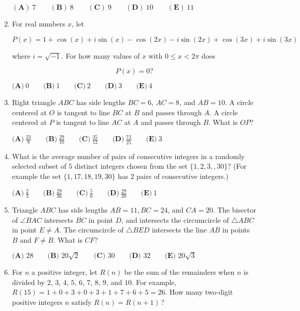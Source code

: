 \documentclass{article}
\begin{document}
\begin{enumerate}[label=\arabic*., itemsep=0.5em]
$(\textbf{A})\: 7\qquad(\textbf{B}) \: 8\qquad(\textbf{C}) \: 9\qquad(\textbf{D}) \: 10\qquad(\textbf{E}) \: 11$\par \vspace{0.5em}\item For real numbers $x$, let 

\begin{equation*}
P(x)=1+\cos(x)+i\sin(x)-\cos(2x)-i\sin(2x)+\cos(3x)+i\sin(3x)
\end{equation*}

where $i = \sqrt{-1}$. For how many values of $x$ with $0\leq x<2\pi$ does 

\begin{equation*}
P(x)=0?
\end{equation*}


$\textbf{(A)}\ 0 \qquad\textbf{(B)}\  1 \qquad\textbf{(C)}\  2 \qquad\textbf{(D)}\
3 \qquad\textbf{(E)}\ 4$\par \vspace{0.5em}\item Right triangle $ABC$ has side lengths $BC=6$, $AC=8$, and $AB=10$. A circle centered at $O$ is tangent to line $BC$ at $B$ and passes through $A$. A circle centered at $P$ is tangent to line $AC$ at $A$ and passes through $B$. What is $OP$?

$\textbf{(A)}\ \frac{23}{8} \qquad\textbf{(B)}\  \frac{29}{10} \qquad\textbf{(C)}\  \frac{35}{12} \qquad\textbf{(D)}\
\frac{73}{25} \qquad\textbf{(E)}\ 3$\par \vspace{0.5em}\item What is the average number of pairs of consecutive integers in a randomly selected subset of $5$ distinct integers chosen from the set $\{ 1, 2, 3, , 30\}$? (For example the set $\{1, 17, 18, 19, 30\}$ has $2$ pairs of consecutive integers.)

$\textbf{(A)}\ \frac{2}{3} \qquad\textbf{(B)}\ \frac{29}{36} \qquad\textbf{(C)}\ \frac{5}{6} \qquad\textbf{(D)}\
\frac{29}{30} \qquad\textbf{(E)}\ 1$\par \vspace{0.5em}\item Triangle $ABC$ has side lengths $AB = 11, BC=24$, and $CA = 20$. The bisector of $\angle{BAC}$ intersects $\overline{BC}$ in point $D$, and intersects the circumcircle of $\triangle{ABC}$ in point $E \ne A$. The circumcircle of $\triangle{BED}$ intersects the line $AB$ in points $B$ and $F \ne B$. What is $CF$?

$\textbf{(A) } 28 \qquad \textbf{(B) } 20\sqrt{2} \qquad \textbf{(C) } 30 \qquad \textbf{(D) } 32 \qquad \textbf{(E) } 20\sqrt{3}$\par \vspace{0.5em}\item For $n$ a positive integer, let $R(n)$ be the sum of the remainders when $n$ is divided by $2$, $3$, $4$, $5$, $6$, $7$, $8$, $9$, and $10$. For example, $R(15) = 1+0+3+0+3+1+7+6+5=26$. How many two-digit positive integers $n$ satisfy $R(n) = R(n+1)\,?$


\end{enumerate}
\end{document}
